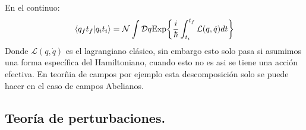 En el continuo:
\begin{equation}
\langle q_{f}t_{f}|q_it_i\rangle=\mathcal{N}\int\mathcal{D}q\text{Exp\ensuremath{\left\{ \frac{i}{\hbar}\int_{t_{i}}^{t_{f}}\mathcal{L}(q,\dot{q})dt\right\} }}
\end{equation}
Donde $\mathcal{L}(q,\dot{q})$ es el lagrangiano clásico, sin embargo esto solo pasa si asumimos una forma específica del Hamiltoniano, cuando esto no es asi se tiene una acción efectiva. En teorñia de campos por ejemplo esta descomposición solo se puede hacer en el caso de campos Abelianos.
\newpage
 
 

\subsection{Teoría de perturbaciones.}

